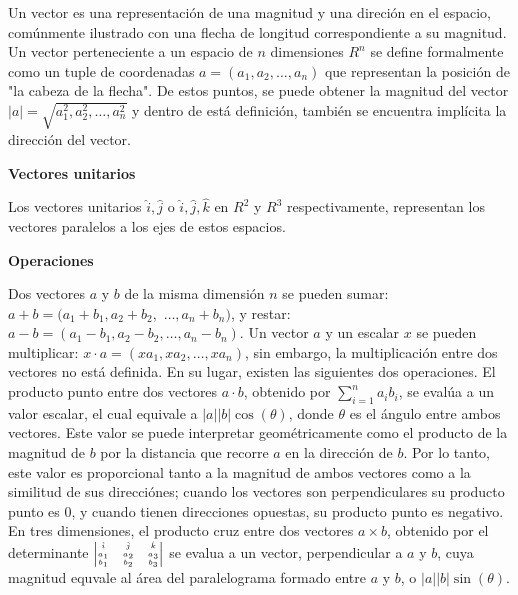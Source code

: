 \documentclass[letterpaper,11pt]{article}
\begin{document}
\medskip

Un vector es una representación de una magnitud y una direción en el espacio, comúnmente ilustrado con una flecha de longitud correspondiente a su magnitud. Un vector perteneciente a un espacio de $n$ dimensiones $R^n$ se define formalmente como un tuple de coordenadas $a = (a_1,a_2,\dots,a_n)$ que representan la posición de "la cabeza de la flecha". De estos puntos, se puede obtener la magnitud del vector $|a| = \sqrt{a_1^2,a_2^2,\dots,a_n^2}$ y dentro de está definición, también se encuentra implícita la dirección del vector.

\medskip

{\large\bfseries Vectores unitarios}

Los vectores unitarios $\hat{i}, \hat{j}$ o $\hat{i}, \hat{j}, \hat{k}$ en $R^2$ y $R^3$ respectivamente, representan los vectores paralelos a los ejes de estos espacios.

\medskip

{\large\bfseries Operaciones}

Dos vectores $a$ y $b$ de la misma dimensión $n$ se pueden sumar: $a + b = (a_1 + b_1, a_2 + b_2,$ $\dots,a_n+b_n)$, y restar: $a - b = (a_1 - b_1, a_2 - b_2, \dots, a_n - b_n)$. Un vector $a$ y un escalar $x$ se pueden multiplicar: $x \cdot a = (x a_1,x a_2,\dots,x a_n)$, sin embargo, la multiplicación entre dos vectores no está definida. En su lugar, existen las siguientes dos operaciones. El producto punto entre dos vectores $a \cdot b$, obtenido por $\sum_{i=1}^{n} a_i b_i$, se evalúa a un valor escalar, el cual equivale a $|a| |b| \cos(\theta)$, donde $\theta$ es el ángulo entre ambos vectores. Este valor se puede interpretar geométricamente como el producto de la magnitud de $b$ por la distancia que recorre $a$ en la dirección de $b$. Por lo tanto, este valor es proporcional tanto a la magnitud de ambos vectores como a la similitud de sus direcciónes; cuando los vectores son perpendiculares su producto punto es $0$, y cuando tienen direcciones opuestas, su producto punto es negativo. En tres dimensiones, el producto cruz entre dos vectores $a \times b$, obtenido por el determinante $\tiny\begin{vmatrix}
  \hat{i}
  & \hat{j}
  & \hat{k}
  \\
  a_1
  & a_2
  & a_3
  \\
  b_1
  & b_2
  & b_3
\end{vmatrix}$ se evalua a un vector, perpendicular a $a$ y $b$, cuya magnitud equvale al área del paralelograma formado entre $a$ y $b$, o $|a| |b| \sin(\theta)$.
\end{document}
